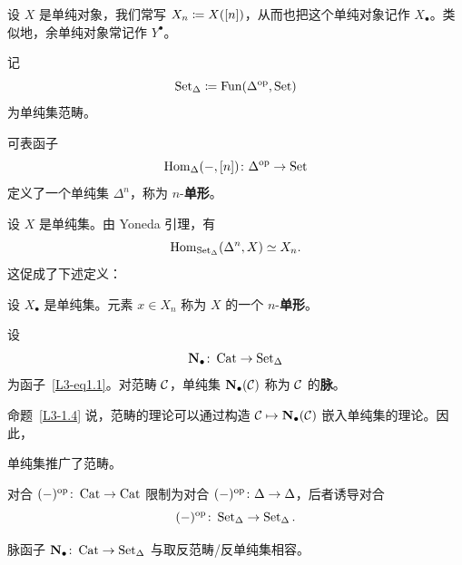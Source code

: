 \nitem\label{L3-1.6}
设 $X$ 是单纯对象，我们常写 $X_{n}\coloneqq X([n])$，从而也把这个单纯对象记作 $X_{\bullet}$。类似地，余单纯对象常记作 $Y^{\bullet}$。

\begin{definition}\label{L3-1.7}
记
\[
\operatorname{Set}_{\Delta}\coloneqq\operatorname{Fun}(\Delta^{\mathrm{op}},\operatorname{Set})
\]
为单纯集范畴。
\end{definition}

\begin{example}\label{L3-1.8}
可表函子
\[
\operatorname{Hom}_{\Delta}(-,[n])\colon\Delta^{\mathrm{op}}\to\operatorname{Set}
\]
定义了一个单纯集 $\Delta^{n}$，称为 $n$-\textbf{单形}。
\end{example}

\nitem\label{L3-1.9}
设 $X$ 是单纯集。由 Yoneda 引理，有
\[
\operatorname{Hom}_{\operatorname{Set}_{\Delta}}(\Delta^{n},X)\simeq X_{n}.
\]
这促成了下述定义：

\begin{definition}\label{L3-1.10}
设 $X_{\bullet}$ 是单纯集。元素 $x\in X_{n}$ 称为 $X$ 的一个 $n$-\textbf{单形}。
\end{definition}

\begin{definition}\label{L3-1.11}
设
\[
\mathbf{N}_{\bullet}\colon\operatorname{Cat}\to\operatorname{Set}_{\Delta}
\]
为函子~\eqref{L3-eq1.1}。对范畴 $\mathcal{C}$，单纯集 $\mathbf{N}_{\bullet}(\mathcal{C})$ 称为 $\mathcal{C}$ 的\textbf{脉}。
\end{definition}


\nitem\label{L3-1.12}
命题~\ref{L3-1.4} 说，范畴的理论可以通过构造 $\mathcal{C}\mapsto\mathbf{N}_{\bullet}(\mathcal{C})$ 嵌入单纯集的理论。因此，

\begin{slogan}\label{L3-1.13}\centering\par
单纯集推广了范畴。
\end{slogan}

\begin{construction}\label{L3-1.14}
对合 $(-)^{\mathrm{op}}\colon\operatorname{Cat}\to\operatorname{Cat}$ 限制为对合 $(-)^{\mathrm{op}}\colon\Delta\to\Delta$，后者诱导对合
\[
(-)^{\mathrm{op}}\colon\operatorname{Set}_{\Delta}\to\operatorname{Set}_{\Delta}.
\]
\end{construction}

\begin{exercise}\label{L3-1.15}
脉函子 $\mathbf{N}_{\bullet}\colon\operatorname{Cat}\to\operatorname{Set}_{\Delta}$ 与取反范畴/反单纯集相容。
\end{exercise}

